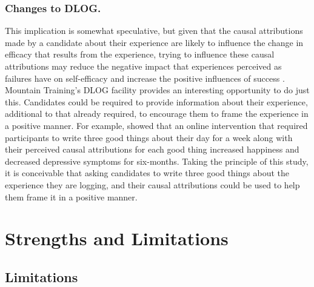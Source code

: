 \documentclass[
  12pt,
  a4paper,
]{book}
\begin{document}
\hypertarget{changes-to-dlog.}{%
\subsubsection{Changes to DLOG.}\label{changes-to-dlog.}}

This implication is somewhat speculative, but given that the causal attributions made by a candidate about their experience are likely to influence the change in efficacy that results from the experience, trying to influence these causal attributions may reduce the negative impact that experiences perceived as failures have on self-efficacy and increase the positive influences of success \citep[cf.~][]{Rees2005}. Mountain Training's DLOG facility provides an interesting opportunity to do just this. Candidates could be required to provide information about their experience, additional to that already required, to encourage them to frame the experience in a positive manner. For example, \citet{Seligman2005} showed that an online intervention that required participants to write three good things about their day for a week along with their perceived causal attributions for each good thing increased happiness and decreased depressive symptoms for six-months. Taking the principle of this study, it is conceivable that asking candidates to write three good things about the experience they are logging, and their causal attributions could be used to help them frame it in a positive manner.

\hypertarget{general-discussion-strenghts-limitations}{%
\section{Strengths and Limitations}\label{general-discussion-strenghts-limitations}}

\hypertarget{general-discussion-limitations}{%
\subsection{Limitations}\label{general-discussion-limitations}}
\end{document}

